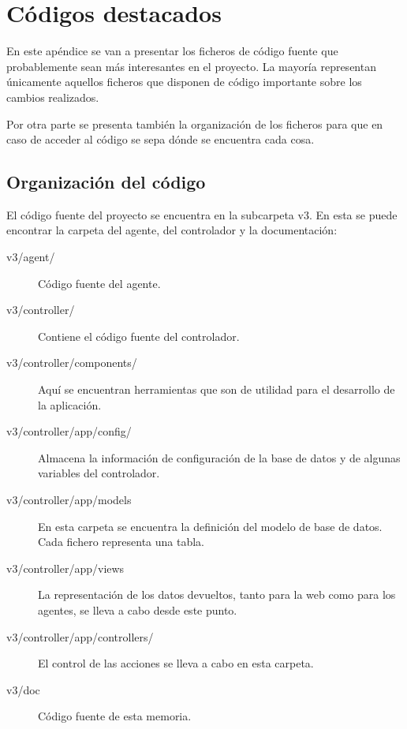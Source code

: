 \chapter{Códigos destacados} 

En este apéndice se van a presentar los ficheros de código fuente que probablemente sean más interesantes en el proyecto. La mayoría representan únicamente aquellos ficheros que disponen de código importante sobre los cambios realizados.

Por otra parte se presenta también la organización de los ficheros para que en caso de acceder al código se sepa dónde se encuentra cada cosa.

\section{Organización del código}

El código fuente del proyecto se encuentra en la subcarpeta v3. En esta se puede encontrar la carpeta del agente, del controlador y la documentación:

\begin{description}
	\item[v3/agent/] Código fuente del agente.

	\item[v3/controller/] Contiene el código fuente del controlador.
	
	\item[v3/controller/components/] Aquí se encuentran herramientas que son de utilidad para el desarrollo de la aplicación.

	\item[v3/controller/app/config/] Almacena la información de configuración de la base de datos y de algunas variables del controlador.

	\item[v3/controller/app/models] En esta carpeta se encuentra la definición del modelo de base de datos. Cada fichero representa una tabla.

	\item[v3/controller/app/views] La representación de los datos devueltos, tanto para la web como para los agentes, se lleva a cabo desde este punto.

	\item[v3/controller/app/controllers/] El control de las acciones se lleva a cabo en esta carpeta.

	\item[v3/doc] Código fuente de esta memoria.
\end{description}

